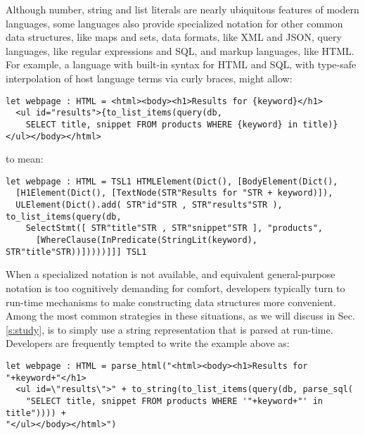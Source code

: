 Although number, string and list literals are nearly ubiquitous features of modern languages, some languages also  provide specialized notation for other common data structures, like maps and sets, data formats, like XML and JSON, query languages, like regular expressions and SQL, and markup languages, like HTML. For example, a language with built-in syntax for HTML and SQL, with type-safe interpolation of host language terms via curly braces, might allow:
\begin{lstlisting}
let webpage : HTML = <html><body><h1>Results for {keyword}</h1>
  <ul id="results">{to_list_items(query(db, 
    SELECT title, snippet FROM products WHERE {keyword} in title)}
</ul></body></html>
\end{lstlisting}
to mean:
\begin{lstlisting}
let webpage : HTML = TSL1 HTMLElement(Dict(), [BodyElement(Dict(),
  [H1Element(Dict(), [TextNode(STR"Results for "STR + keyword)]), 
  ULElement(Dict().add( STR"id"STR , STR"results"STR ), to_list_items(query(db, 
    SelectStmt([ STR"title"STR , STR"snippet"STR ], "products", 
      [WhereClause(InPredicate(StringLit(keyword), STR"title"STR))]))))]]] TSL1
\end{lstlisting}

When a specialized notation is not available, and equivalent general-purpose notation is too cognitively demanding for comfort, developers typically turn to run-time mechanisms to make constructing data structures more convenient. Among the most common strategies in these situations, as we will discuss in Sec. \ref{s:study}, is to simply use a string representation that is parsed at run-time. Developers are frequently  tempted to write the example above as:
\begin{lstlisting}
let webpage : HTML = parse_html("<html><body><h1>Results for "+keyword+"</h1>
  <ul id=\"results\">" + to_string(to_list_items(query(db, parse_sql(
  	"SELECT title, snippet FROM products WHERE '"+keyword+"' in title")))) + 
"</ul></body></html>")
\end{lstlisting}

